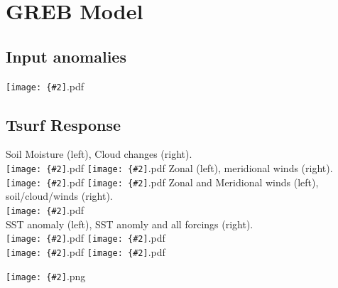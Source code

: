 \documentclass[12pt,a4paper]{article}
\newcommand{\pngfig}[2][0.5]{\texttt{[image: \{\#2]}.png}}
\newcommand{\pdffig}[2][0.5]{\texttt{[image: \{\#2]}.pdf}}
\begin{document}
\section{GREB Model}
\subsection{Input anomalies}
\pdffig[1.0]{anom.input.4ycomp}

\subsection{Tsurf Response}
Soil Moisture (left),  Cloud changes (right).\\
\pdffig[0.5]{tsfc_dif.smc.pos.4ycomp}
\pdffig[0.5]{tsfc_dif.cld.pos.4ycomp}
Zonal (left), meridional winds (right).\\
\pdffig[0.5]{tsfc_dif.u_anom.pos.4ycomp}
\pdffig[0.5]{tsfc_dif.v_anom.pos.4ycomp}
Zonal and Meridional winds (left), soil/cloud/winds (right).\\
\pdffig[0.5]{tsfc_dif.uv_anom.pos.4ycomp}\\
SST anomaly (left), SST anomly and all forcings (right).\\
\pdffig[0.5]{tsfc_dif.all.pos.4ycomp}
\pdffig[0.5]{tsfc_dif.sst_anom.pos.4ycomp}\\
\pdffig[0.5]{tsfc_dif.all_sst.pos.4ycomp}
\pdffig[0.5]{dif_all_sst}

\pngfig[0.5]{comp_Tmax_sfc}

% 
% 
% 
% 
\end{document}
